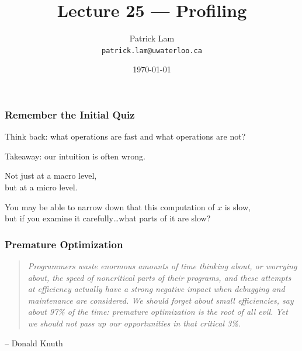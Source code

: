 

\title{Lecture 25 --- Profiling }

\author{Patrick Lam \\ \small \texttt{patrick.lam@uwaterloo.ca}}
\date{\today}




\begin{frame}
  \titlepage

 \end{frame}


\begin{frame}
\frametitle{Remember the Initial Quiz}


Think back: what operations are fast and what operations are not?

Takeaway: our intuition  is often wrong. 

Not just at a macro level, \\
but at a micro level. 

You may be able to narrow down that this computation of $x$ is slow, \\
but if you examine it carefully\ldots what parts of it are slow?


\end{frame}



\begin{frame}
\frametitle{Premature Optimization}

\vspace*{.5cm}

\begin{quote}
\textit{Programmers waste enormous amounts of time thinking about, or worrying about, the speed of noncritical parts of their programs, and these attempts at efficiency actually have a strong negative impact when debugging and maintenance are considered. We should forget about small efficiencies, say about 97\% of the time: premature optimization is the root of all evil. Yet we should not pass up our opportunities in that critical 3\%.}
\end{quote}
	\hfill -- Donald Knuth


\end{frame}



